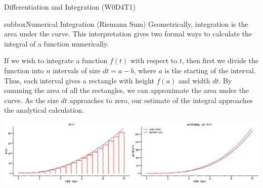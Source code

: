 \begin{textbox}{Differentiation and Integration (W0D4T1) }
\begin{subbox}{subbox}{Numerical Integration (Riemann Sum)}
Geometrically, integration is the area under the curve. This interpretation gives two formal ways to calculate the integral of a function numerically. 

If we wish to integrate a function $f(t)$ with respect to $t$, then first we divide the function into $n$ intervals of size $dt = a-b$, where $a$ is the starting of the interval. Thus, each interval gives a rectangle with height $f(a)$ and width $dt$. By summing the area of all the rectangles, we can approximate the area under the curve. As the size $dt$ approaches to zero, our estimate of the integral approaches the analytical calculation. 

\centering
\includegraphics[scale=0.12]{Figures/PreCourse/CFigure4.png}
\end{subbox}


\end{textbox}
